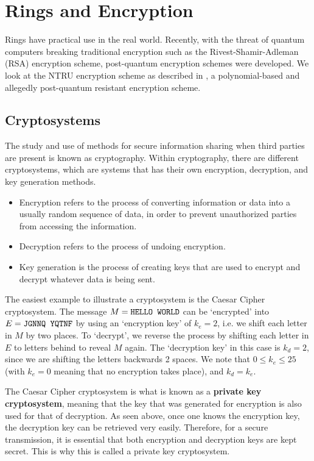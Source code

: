 \chapter{Rings and Encryption}
Rings have practical use in the real world. Recently, with the threat of quantum computers breaking traditional encryption such as the Rivest-Shamir-Adleman (RSA) encryption scheme, post-quantum encryption schemes were developed. We look at the NTRU encryption scheme as described in \cite{hoffstein_pipher_silverman_1996}, a polynomial-based and allegedly post-quantum resistant encryption scheme.

\section{Cryptosystems}
The study and use of methods for secure information sharing when third parties are present is known as cryptography. Within cryptography, there are different cryptosystems, which are systems that has their own encryption, decryption, and key generation methods.
\begin{itemize}
    \item Encryption refers to the process of converting information or data into a usually random sequence of data, in order to prevent unauthorized parties from accessing the information.
    \item Decryption refers to the process of undoing encryption.
    \item Key generation is the process of creating keys that are used to encrypt and decrypt whatever data is being sent.
\end{itemize}

\begin{example}
    The easiest example to illustrate a cryptosystem is the Caesar Cipher cryptosystem. The message $M = \texttt{HELLO WORLD}$ can be `encrypted' into $E = \texttt{JGNNQ YQTNF}$ by using an `encryption key' of $k_e = 2$, i.e. we shift each letter in $M$ by two places. To `decrypt', we reverse the process by shifting each letter in $E$ to letters behind to reveal $M$ again. The `decryption key' in this case is $k_d = 2$, since we are shifting the letters backwards 2 spaces. We note that $0 \leq k_e \leq 25$ (with $k_e = 0$ meaning that no encryption takes place), and $k_d = k_e$.
\end{example}

The Caesar Cipher cryptosystem is what is known as a \textbf{private key cryptosystem}, meaning that the key that was generated for encryption is also used for that of decryption. As seen above, once one knows the encryption key, the decryption key can be retrieved very easily. Therefore, for a secure transmission, it is essential that both encryption and decryption keys are kept secret. This is why this is called a private key cryptosystem.

